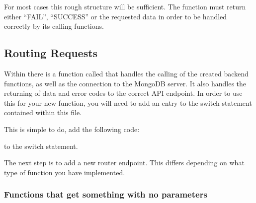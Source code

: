 \documentclass[letterpaper,10pt,english]{sphinxmanual}
\let\oldsubsection\subsection
\renewcommand{\subsection}{\needspace{6\baselineskip}\oldsubsection}
\begin{document}
For most cases this rough structure will be sufficient. The function
must return either “FAIL”, “SUCCESS” or the requested data in order to
be handled correctly by its calling functions.


\subsection{Routing Requests}
\label{\detokenize{docs/Expansion/api-expansion:routing-requests}}
Within  there is a function called
 that handles the calling of the created back\sphinxhyphen{}end
functions, as well as the connection to the MongoDB server. It also
handles the returning of data and error codes to the correct API
endpoint. In order to use this for your new function, you will need to
add an entry to the switch statement contained within this file.

This is simple to do, add the following code:

\begin{sphinxVerbatim}[commandchars=\\\{\}]
 
        
\end{sphinxVerbatim}

to the switch statement.

The next step is to add a new router endpoint. This differs depending on
what type of function you have implemented.


\subsubsection{Functions that get something with no parameters}
\label{\detokenize{docs/Expansion/api-expansion:functions-that-get-something-with-no-parameters}}
\begin{sphinxVerbatim}[commandchars=\\\{\}]
      
         
     
     
\end{sphinxVerbatim}
\end{document}
